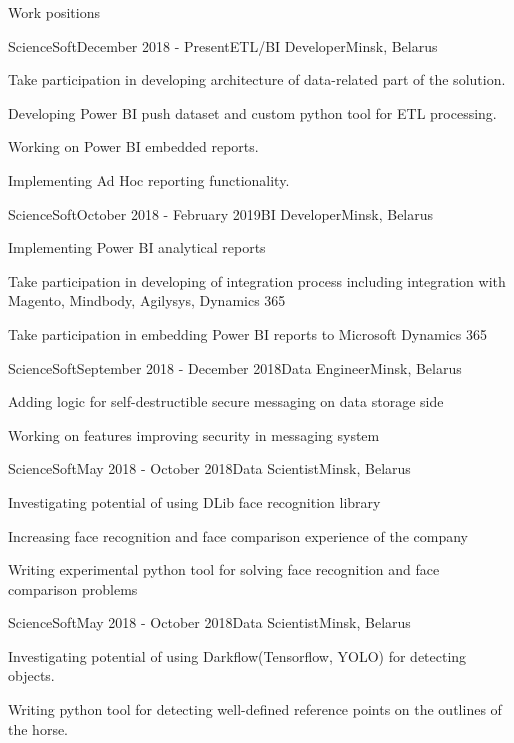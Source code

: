 \documentclass{resume} %
\begin{document}
\begin{rSection}{Work positions}

\begin{rSubsection}{ScienceSoft}{December 2018 - Present}{ETL/BI Developer}{Minsk, Belarus}
\item Take participation in developing architecture of data-related part of the solution.
\item Developing Power BI push dataset and custom python tool for ETL processing.
\item Working on Power BI embedded reports.
\item Implementing Ad Hoc reporting functionality.
\end{rSubsection}

\begin{rSubsection}{ScienceSoft}{October 2018 - February 2019}{BI Developer}{Minsk, Belarus}
\item Implementing Power BI analytical reports
\item Take participation in developing of integration process including integration with Magento, Mindbody, Agilysys, Dynamics 365
\item Take participation in embedding Power BI reports to Microsoft Dynamics 365
\end{rSubsection}

\begin{rSubsection}{ScienceSoft}{September 2018 - December 2018}{Data Engineer}{Minsk, Belarus}
\item Adding logic for self-destructible secure messaging on data storage side
\item Working on features improving security in messaging system
\end{rSubsection}

\begin{rSubsection}{ScienceSoft}{May 2018 - October 2018}{Data Scientist}{Minsk, Belarus}
\item Investigating potential of using DLib face recognition library
\item Increasing face recognition and face comparison experience of the company
\item Writing experimental python tool for solving face recognition and face comparison problems
\end{rSubsection}

\begin{rSubsection}{ScienceSoft}{May 2018 - October 2018}{Data Scientist}{Minsk, Belarus}
\item Investigating potential of using Darkflow(Tensorflow, YOLO) for detecting objects.
\item Writing python tool for detecting well-defined reference points on the outlines of the horse.
\end{rSubsection}


\end{rSection}
\end{document}
